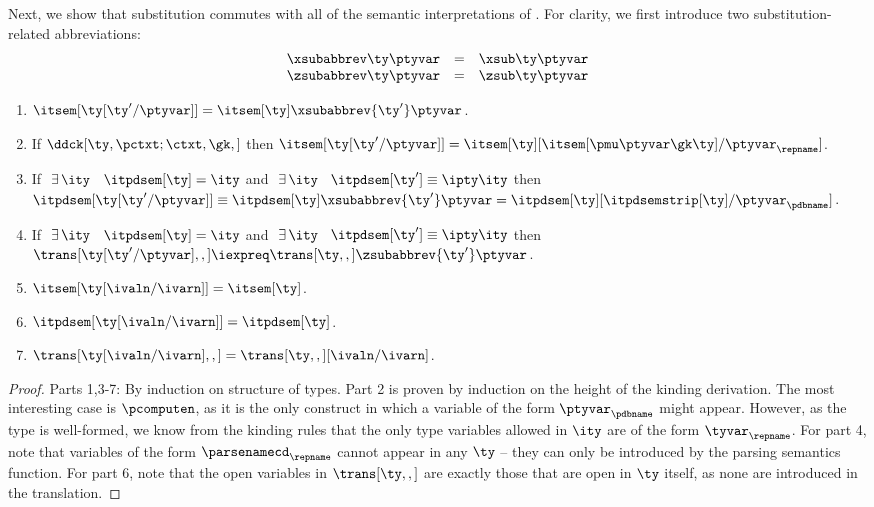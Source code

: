 Next, we show that substitution commutes with all of the
semantic interpretations of \ddc{}. For clarity, we first introduce
two substitution-related abbreviations:
\[
\begin{array}{lll}
\xsubabbrev \ty \ptyvar & = & \xsub \ty \ptyvar\\
\zsubabbrev \ty \ptyvar & = & \zsub \ty \ptyvar
\end{array}
\]  

\begin{lemma}
  \begin{enumerate}
  \item $\itsem[{\ty[\ty'/\ptyvar]}] = \itsem[\ty]\xsubabbrev {\ty'} \ptyvar$.
  \item If $\ddck[\ty,\pctxt;\ctxt,\gk,]$ then $\itsem[{\ty[\ty'/\ptyvar]}] = 
    \itsem[\ty][\itsem[\pmu \ptyvar \gk \ty]/\ptyvar_\repname]$.
  \item If $\ \exists\,\ity$ \suchthat\ $\itpdsem[\ty] = \ity$ and
    $\ \exists\,\ity$ \suchthat\ $\itpdsem[\ty'] \equiv {\ipty \ity}$
then $\itpdsem[{\ty[\ty'/\ptyvar]}] \equiv
    \itpdsem[\ty]\xsubabbrev {\ty'} \ptyvar = 
    \itpdsem[\ty][\itpdsemstrip[\ty]/\ptyvar_\pdbname]$.
  \item If $\ \exists\,\ity$ \suchthat\ $\itpdsem[\ty] = \ity$ and
    $\ \exists\,\ity$ \suchthat\ $\itpdsem[\ty'] \equiv {\ipty \ity}$
then $\trans[{\ty[\ty'/\ptyvar]},,] \iexpreq
    \trans[\ty,,]\zsubabbrev {\ty'} \ptyvar$.
  \item $\itsem[{\ty[\ivaln/\ivarn]}] = \itsem[\ty]$.
  \item $\itpdsem[{\ty[\ivaln/\ivarn]}] = \itpdsem[\ty]$.
  \item $\trans[{\ty[\ivaln/\ivarn]},,] = \trans[\ty,,][\ivaln/\ivarn]$.
  \end{enumerate}
\label{lemma:subst-comm}
\end{lemma}

\begin{proof}
  Parts 1,3-7: By induction on structure of types. 
  Part 2 is proven by induction
  on the height of the kinding derivation.  The most interesting case
  is $\pcomputen$, as it is the only construct in which a variable of
  the form $\ptyvar_\pdbname$ might appear. However, as the type is
  well-formed, we know from the kinding rules that the only type
  variables allowed in $\ity$ are of the form $\tyvar_\repname$.
  For part 4, note that variables of the form $\parsenamecd_\repname$
  cannot appear in any $\ty$ -- they can only be introduced by the
  parsing semantics function. 
  For part 6, note that the open variables in $\trans[\ty,,]$ are
  exactly those that are open in $\ty$ itself, as none are introduced
  in the translation.
\end{proof}

